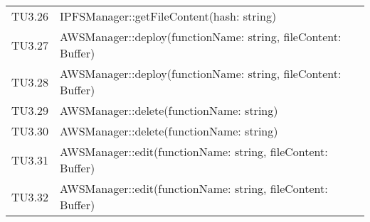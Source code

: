 \begin{longtable}{
		>{\centering}p{}
		>{}p{}}
	TU3.26 & IPFSManager::getFileContent(hash: string) \\
	
	TU3.27 & AWSManager::deploy(functionName: string, fileContent: Buffer) \\
	
	TU3.28 & AWSManager::deploy(functionName: string, fileContent: Buffer) \\
	
	TU3.29 & AWSManager::delete(functionName: string) \\
	
	TU3.30 & AWSManager::delete(functionName: string) \\
	
	TU3.31 & AWSManager::edit(functionName: string, fileContent: Buffer) \\
	
	TU3.32 & AWSManager::edit(functionName: string, fileContent: Buffer) \\
	
\end{longtable}
